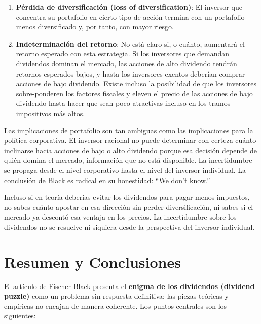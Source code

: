 \documentclass[12pt]{article}
\begin{document}
\begin{enumerate}
  \item \textbf{P\'erdida de diversificaci\'on (loss of diversification)}: El inversor que concentra su portafolio en cierto tipo de acci\'on termina con un portafolio menos diversificado y, por tanto, con mayor riesgo.
  \item \textbf{Indeterminaci\'on del retorno}: No est\'a claro si, o cu\'anto, aumentar\'a el retorno esperado con esta estrategia. Si los inversores que demandan dividendos dominan el mercado, las acciones de alto dividendo tendr\'an retornos esperados bajos, y hasta los inversores exentos deber\'ian comprar acciones de bajo dividendo. Existe incluso la posibilidad de que los inversores sobre-ponderen los factores fiscales y eleven el precio de las acciones de bajo dividendo hasta hacer que sean poco atractivas incluso en los tramos impositivos m\'as altos.
\end{enumerate}

\begin{explicacion}
Las implicaciones de portafolio son tan ambiguas como las implicaciones para la pol\'itica corporativa. El inversor racional no puede determinar con certeza cu\'anto inclinarse hacia acciones de bajo o alto dividendo porque esa decisi\'on depende de qui\'en domina el mercado, informaci\'on que no est\'a disponible. La incertidumbre se propaga desde el nivel corporativo hasta el nivel del inversor individual. La conclusi\'on de Black es radical en su honestidad: ``We don't know.''
\end{explicacion}

\begin{intuicion}
Incluso si en teor\'ia deber\'ias evitar los dividendos para pagar menos impuestos, no sabes cu\'anto apostar en esa direcci\'on sin perder diversificaci\'on, ni sabes si el mercado ya descontó esa ventaja en los precios. La incertidumbre sobre los dividendos no se resuelve ni siquiera desde la perspectiva del inversor individual.
\end{intuicion}

\section{Resumen y Conclusiones}

El art\'iculo de Fischer Black presenta el \textbf{enigma de los dividendos (dividend puzzle)} como un problema sin respuesta definitiva: las piezas te\'oricas y emp\'iricas no encajan de manera coherente. Los puntos centrales son los siguientes:
\end{document}
